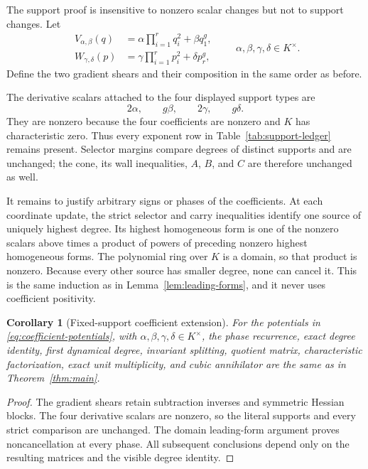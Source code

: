 \documentclass[11pt]{article}
\newtheorem{corollary}[theorem]{Corollary}
\theoremstyle{remark}
\numberwithin{equation}{section}
\begin{document}
The support proof is insensitive to nonzero scalar changes but not to
support changes.  Let
\begin{equation}\label{eq:coefficient-potentials}
\begin{aligned}
V_{\alpha,\beta}(q)
&=\alpha\prod_{i=1}^{r}q_i^2+\beta q_1^g,\\
W_{\gamma,\delta}(p)
&=\gamma\prod_{i=1}^{r}p_i^2+\delta p_r^g,
\end{aligned}
\qquad
\alpha,\beta,\gamma,\delta\in K^\times.
\end{equation}
Define the two gradient shears and their composition in the same order as
before.

The derivative scalars attached to the four displayed support types are
\[
2\alpha,\qquad g\beta,\qquad 2\gamma,\qquad g\delta.
\]
They are nonzero because the four coefficients are nonzero and \(K\) has
characteristic zero.  Thus every exponent row in
Table~\ref{tab:support-ledger} remains present.  Selector margins compare
degrees of distinct supports and are unchanged; the cone, its wall
inequalities, \(A\), \(B\), and \(C\) are therefore unchanged as well.

It remains to justify arbitrary signs or phases of the coefficients.  At
each coordinate update, the strict selector and carry inequalities identify
one source of uniquely highest degree.  Its highest homogeneous form is one
of the nonzero scalars above times a product of powers of preceding nonzero
highest homogeneous forms.  The polynomial ring over \(K\) is a domain, so
that product is nonzero.  Because every other source has smaller degree,
none can cancel it.  This is the same induction as in
Lemma~\ref{lem:leading-forms}, and it never uses coefficient positivity.

\begin{corollary}[Fixed-support coefficient extension]\label{cor:coefficients}
For the potentials in \eqref{eq:coefficient-potentials}, with
\(\alpha,\beta,\gamma,\delta\in K^\times\), the phase recurrence, exact
degree identity, first dynamical degree, invariant splitting, quotient
matrix, characteristic factorization, exact unit multiplicity, and cubic
annihilator are the same as in Theorem~\ref{thm:main}.
\end{corollary}

\begin{proof}
The gradient shears retain subtraction inverses and symmetric Hessian blocks.
The four derivative scalars are nonzero, so the literal supports and every
strict comparison are unchanged.  The domain leading-form argument proves
noncancellation at every phase.  All subsequent conclusions depend only on
the resulting matrices and the visible degree identity.
\end{proof}
\end{document}

